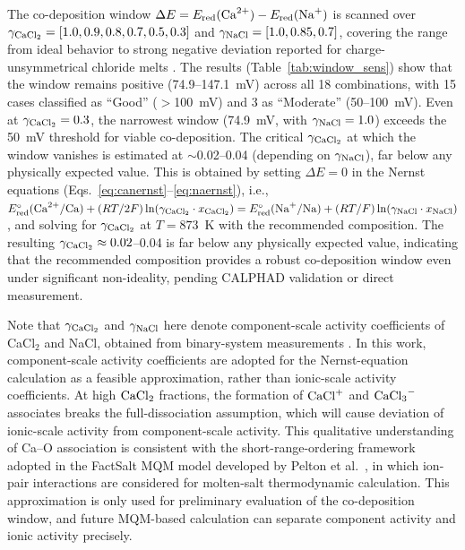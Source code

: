 \documentclass[sn-mathphys,Numbered]{sn-jnl}
\begin{document}
The co-deposition window $\Delta E = E_{\mathrm{red}}(\ce{Ca^{2+}}) - E_{\mathrm{red}}(\ce{Na+})$ is scanned over $\gamma_{\ce{CaCl2}} = [1.0, 0.9, 0.8, 0.7, 0.5, 0.3]$ and $\gamma_{\ce{NaCl}} = [1.0, 0.85, 0.7]$, covering the range from ideal behavior to strong negative deviation reported for charge-unsymmetrical chloride melts \cite{kleppa1966}. The results (Table~\ref{tab:window_sens}) show that the window remains positive (74.9--147.1~mV) across all 18 combinations, with 15 cases classified as ``Good'' ($>$100~mV) and 3 as ``Moderate'' (50--100~mV). Even at $\gamma_{\ce{CaCl2}} = 0.3$, the narrowest window (74.9~mV, with $\gamma_{\ce{NaCl}} = 1.0$) exceeds the 50~mV threshold for viable co-deposition. The critical $\gamma_{\ce{CaCl2}}$ at which the window vanishes is estimated at $\sim$0.02--0.04 (depending on $\gamma_{\ce{NaCl}}$), far below any physically expected value. This is obtained by setting $\Delta E = 0$ in the Nernst equations (Eqs.~\ref{eq:canernst}--\ref{eq:naernst}), i.e., $E^{\circ}_{\mathrm{red}}(\ce{Ca^{2+}/Ca}) + (RT/2F)\ln(\gamma_{\ce{CaCl2}} \cdot x_{\ce{CaCl2}}) = E^{\circ}_{\mathrm{red}}(\ce{Na+/Na}) + (RT/F)\ln(\gamma_{\ce{NaCl}} \cdot x_{\ce{NaCl}})$, and solving for $\gamma_{\ce{CaCl2}}$ at $T = 873$~K with the recommended composition. The resulting $\gamma_{\ce{CaCl2}} \approx 0.02$--0.04 is far below any physically expected value, indicating that the recommended composition provides a robust co-deposition window even under significant non-ideality, pending CALPHAD validation or direct measurement.

Note that $\gamma_{\ce{CaCl2}}$ and $\gamma_{\ce{NaCl}}$ here denote component-scale activity coefficients of CaCl$_2$ and NaCl, obtained from binary-system measurements \cite{kleppa1966,chartrand2000}. In this work, component-scale activity coefficients are adopted for the Nernst-equation calculation as a feasible approximation, rather than ionic-scale activity coefficients. At high $\ce{CaCl2}$ fractions, the formation of $\ce{CaCl+}$ and $\ce{CaCl3-}$ associates breaks the full-dissociation assumption, which will cause deviation of ionic-scale activity from component-scale activity. This qualitative understanding of Ca--O association is consistent with the short-range-ordering framework adopted in the FactSalt MQM model developed by Pelton et al.\ \cite{pelton2000mqm}, in which ion-pair interactions are considered for molten-salt thermodynamic calculation. This approximation is only used for preliminary evaluation of the co-deposition window, and future MQM-based calculation can separate component activity and ionic activity precisely.
\end{document}
